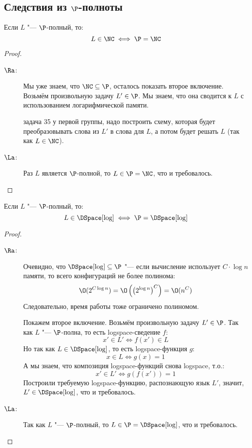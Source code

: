 \subsection[Следствия из P-полноты]{Следствия из $\P$-полноты}
	\begin{theorem}
		Если $L$ "--- $\P$-полный, то:
		\[ L \in \NC \iff \P = \NC \]
	\end{theorem}
	\begin{proof}
		\begin{description}
			\item[$\Ra$:]
				Мы уже знаем, что $\NC \subseteq \P$, осталось показать второе включение.
				Возьмём произвольную задачу $L' \in \P$.
				Мы знаем, что она сводится к $L$ с использованием логарифмической памяти.

				\TODO задача 35 у первой группы, надо построить схему, которая будет преобразовывать слова из $L'$ в слова для $L$,
				а потом будет решать $L$ (так как $L \in \NC$).
			\item[$\La$:]
				Раз $L$ является $\P$-полной, то $L\in \P = \NC$, что и требовалось.
		\end{description}
	\end{proof}
	\begin{theorem}
		Если $L$ "--- $\P$-полный, то:
		\[ L \in \DSpace[\log] \iff \P = \DSpace[\log] \]
	\end{theorem}
	\begin{proof}
		\begin{description}
			\item[$\Ra$:]
				Очевидно, что $\DSpace[\log] \subseteq \P$ "--- если вычисление использует $C \cdot \log n$ памяти,
				то всего конфигураций не более полинома:
				\[ \O(2^{C\log n})=\O\left(\left(2^{\log n}\right)^C\right)=\O(n^C) \]
				Следовательно, время работы тоже ограничено полиномом.

				Покажем второе включение.
				Возьмём произвольную задачу $L' \in \P$.
				Так как $L$ "--- $\P$-полна, то есть logspace-сведение $f$:
				\[ x' \in L' \iff f(x') \in L \]
				Но так как $L \in \DSpace[\log]$, то есть logspace-функция $g$:
				\[ x \in L \iff g(x) = 1 \]
				А мы знаем, что композиция logspace-функций снова logspace, т.о.:
				\[ x' \in L' \iff g(f(x')) = 1\]
				Построили требуемую logspace-функцию, распознающую язык $L'$, значит, $L' \in \DSpace[\log]$, что и требовалось.
			\item[$\La$:]
				Так как $L$ "--- $\P$-полный, то $L \in \P = \DSpace[\log]$, что и требовалось.
		\end{description}
	\end{proof}

